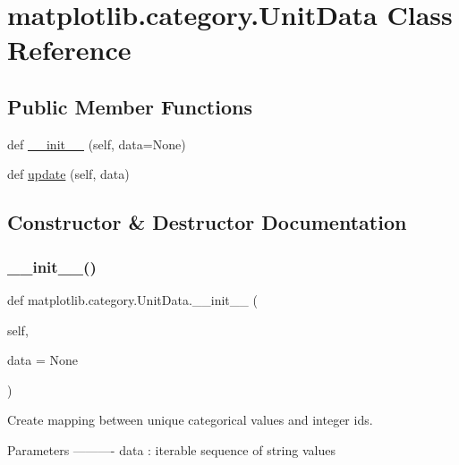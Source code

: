 \hypertarget{classmatplotlib_1_1category_1_1UnitData}{}\section{matplotlib.\+category.\+Unit\+Data Class Reference}
\label{classmatplotlib_1_1category_1_1UnitData}
\subsection*{Public Member Functions}
\begin{DoxyCompactItemize}
\item 
def \hyperlink{classmatplotlib_1_1category_1_1UnitData_afae56563725483b81a455fc208c4a702}{\+\_\+\+\_\+init\+\_\+\+\_\+} (self, data=None)
\item 
def \hyperlink{classmatplotlib_1_1category_1_1UnitData_a2aec47dec865f29c3cd59bfd0912abc7}{update} (self, data)
\end{DoxyCompactItemize}


\subsection{Constructor \& Destructor Documentation}
\mbox{\label{classmatplotlib_1_1category_1_1UnitData_afae56563725483b81a455fc208c4a702}} 
\subsubsection{\texorpdfstring{\+\_\+\+\_\+init\+\_\+\+\_\+()}{\_\_init\_\_()}}
{\footnotesize\ttfamily def matplotlib.\+category.\+Unit\+Data.\+\_\+\+\_\+init\+\_\+\+\_\+ (\begin{DoxyParamCaption}\item[{}]{self,  }\item[{}]{data = {\ttfamily None} }\end{DoxyParamCaption})}

\begin{DoxyVerb}Create mapping between unique categorical values and integer ids.

Parameters
----------
data : iterable
    sequence of string values
\end{DoxyVerb}
 

